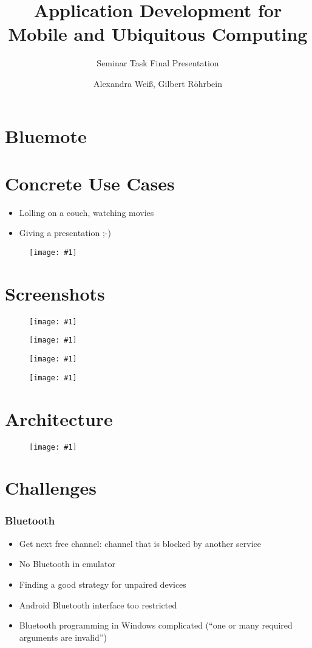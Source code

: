 \documentclass[ddc nogerman]{tudbeamer}
\newcommand{\imageframe}[1]{
    \begin{frame}
        \begin{figure}
            \centering
            \texttt{[image: \#1]}
        \end{figure}
    \end{frame}
}
\begin{document}

\title{Application Development for Mobile and Ubiquitous Computing}
\subtitle{Seminar Task Final Presentation}
\author{Alexandra Weiß, Gilbert Röhrbein}

\maketitle

\section{Bluemote}
\begin{frame}
\end{frame}

\section{Concrete Use Cases}
\begin{frame}
    \begin{itemize}
        \item Lolling on a couch, watching movies
        \item Giving a presentation ;-)
    \end{itemize}
\end{frame}

\imageframe{img/use-case-vlc.jpg}

\section{Screenshots}
\imageframe{img/choosedevice.png}
\imageframe{img/choosefunction.png}
\imageframe{img/presentation.png}
\imageframe{img/vlc.png}

\section{Architecture}
\imageframe{img/components.pdf}

\section{Challenges}
\begin{frame}
	\frametitle{Bluetooth}
    \begin{itemize}
    	\item Get next free channel: channel that is blocked by another service
        \item No Bluetooth in emulator
        \item Finding a good strategy for unpaired devices
        \item Android Bluetooth interface too restricted
		\item Bluetooth programming in Windows complicated (``one or many required arguments are invalid'')
    \end{itemize}
\end{frame}
\end{document}
